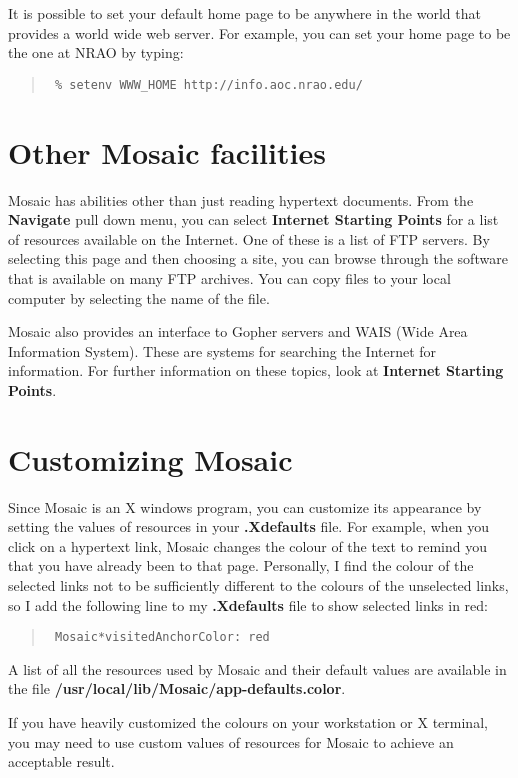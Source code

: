 It is possible to set your default home page to be anywhere in the world that
provides a world wide web server. For example, you can set your home page to be
the one at NRAO by typing:

\begin{quote}{\tt
\% setenv WWW\_HOME http://info.aoc.nrao.edu/
}
\end{quote}

\section{Other Mosaic facilities}

Mosaic has abilities other than just reading hypertext documents. From the {\bf
Navigate} pull down menu, you can select {\bf Internet Starting Points} for a
list of resources available on the Internet. One of these is a list of FTP
servers. By selecting this page and then choosing a site, you can browse
through the software that is available on many FTP archives. You can copy files
to your local computer by selecting the name of the file.

Mosaic also provides an interface to Gopher servers and WAIS (Wide Area
Information System). These are systems for searching the Internet for
information. For further information on these topics, look at {\bf Internet
Starting Points}.

\section{Customizing Mosaic}

Since Mosaic is an X windows program, you can customize its appearance by
setting the values of resources in your {\bf .Xdefaults} file. For example,
when you click on a hypertext link, Mosaic changes the colour of the text to
remind you that you have already been to that page. Personally, I find the
colour of the selected links not to be sufficiently different to the colours of
the unselected links, so I add the following line to my {\bf .Xdefaults} file
to show selected links in red:

\begin{quote}{\tt
Mosaic*visitedAnchorColor:   red
}
\end{quote}

A list of all the resources used by Mosaic and their default values are
available in the file {\bf /usr/local/lib/Mosaic/app-defaults.color}.

If you have heavily customized the colours on your workstation or X terminal,
you may need to use custom values of resources for Mosaic to achieve an
acceptable result.

